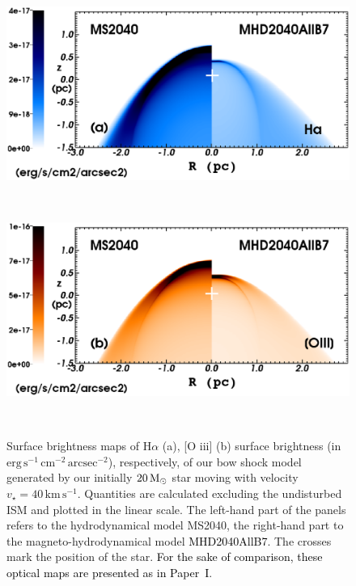 \documentclass[useAMS,usenatbib]{mn2e}
\begin{document}
\begin{figure}
	\begin{minipage}[b]{ 0.48\textwidth}
		\includegraphics[width=1.0\textwidth]{./map_Ha.eps}
	\end{minipage} \\
	\begin{minipage}[b]{ 0.48\textwidth}
		\includegraphics[width=1.0\textwidth]{./map_OIII.eps}
	\end{minipage}	\\ 	
	\caption{
	         Surface brightness maps of H$\alpha$ (a), [O{\sc
iii}] (b) surface brightness (in $\mathrm{erg}\, \mathrm{s}^{-1}\,
\mathrm{cm}^{-2}\, \mathrm{arcsec}^{-2}$), respectively, of our bow shock model 
generated by our initially $20\, \rm M_{\odot}$ star moving with velocity
$v_{\star}=40\, \mathrm{km}\, \mathrm{s}^{-1}$. Quantities are calculated excluding the
undisturbed ISM and plotted in the linear scale. The left-hand part of the panels 
refers to the hydrodynamical model MS2040, the right-hand part to the 
magneto-hydrodynamical model \textcolor{black}{MHD2040AllB7}. The crosses mark the
position of the star. \textcolor{black}{For the sake of comparison, these optical maps 
are presented as in Paper~I}. 
		 }
	\label{fig:maps}  
\end{figure} 
\end{document}
